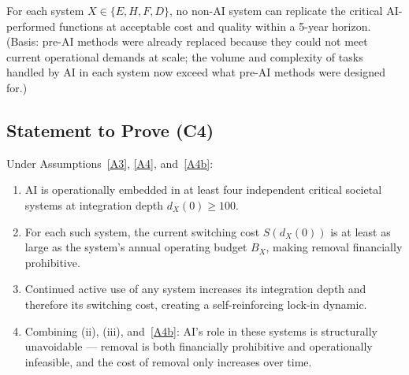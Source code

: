 \begin{assumption}\label{A4b}
  For each system $X \in \{E,H,F,D\}$, no non-AI system can replicate
  the critical AI-performed functions at acceptable cost and quality
  within a 5-year horizon.  (Basis: pre-AI methods were already replaced
  because they could not meet current operational demands at scale; the
  volume and complexity of tasks handled by AI in each system now exceed
  what pre-AI methods were designed for.)
\end{assumption}

\subsection*{Statement to Prove (C4)}

\begin{theorem}\label{thm:C4}
  Under Assumptions~\ref{A3}, \ref{A4}, and~\ref{A4b}:
  \begin{enumerate}
    \item[(i)] AI is operationally embedded in at least four independent
      critical societal systems at integration depth $d_X(0) \geq 100$.
    \item[(ii)] For each such system, the current switching cost
      $S(d_X(0))$ is at least as large as the system's annual operating
      budget $B_X$, making removal financially prohibitive.
    \item[(iii)] Continued active use of any system increases its integration
      depth and therefore its switching cost, creating a self-reinforcing
      lock-in dynamic.
    \item[(iv)] Combining (ii), (iii), and~\ref{A4b}: AI's role in these
      systems is structurally unavoidable — removal is both financially
      prohibitive and operationally infeasible, and the cost of removal
      only increases over time.
  \end{enumerate}
\end{theorem}


